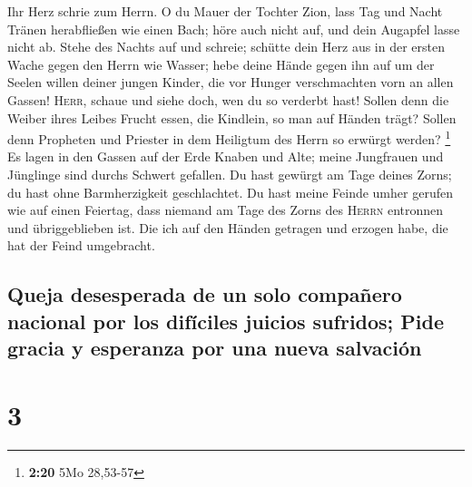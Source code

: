 Ihr Herz schrie zum Herrn. O du Mauer der Tochter Zion,
lass Tag und Nacht Tränen herabfließen wie einen Bach; höre auch nicht
auf, und dein Augapfel lasse nicht ab.  Stehe des Nachts
auf und schreie; schütte dein Herz aus in der ersten Wache gegen den
Herrn wie Wasser; hebe deine Hände gegen ihn auf um der Seelen willen
deiner jungen Kinder, die vor Hunger verschmachten vorn an allen Gassen!
 \textsc{Herr}, schaue und siehe doch, wen du so verderbt
hast! Sollen denn die Weiber ihres Leibes Frucht essen, die Kindlein, so
man auf Händen trägt? Sollen denn Propheten und Priester in dem
Heiligtum des Herrn so erwürgt werden? \footnote{\textbf{2:20} 5Mo
  28,53-57}  Es lagen in den Gassen auf der Erde Knaben
und Alte; meine Jungfrauen und Jünglinge sind durchs Schwert gefallen.
Du hast gewürgt am Tage deines Zorns; du hast ohne Barmherzigkeit
geschlachtet.  Du hast meine Feinde umher gerufen wie auf
einen Feiertag, dass niemand am Tage des Zorns des \textsc{Herrn}
entronnen und übriggeblieben ist. Die ich auf den Händen getragen und
erzogen habe, die hat der Feind umgebracht.

\hypertarget{queja-desesperada-de-un-solo-compauxf1ero-nacional-por-los-difuxedciles-juicios-sufridos-pide-gracia-y-esperanza-por-una-nueva-salvaciuxf3n}{%
\subsection{Queja desesperada de un solo compañero nacional por los
difíciles juicios sufridos; Pide gracia y esperanza por una nueva
salvación}\label{queja-desesperada-de-un-solo-compauxf1ero-nacional-por-los-difuxedciles-juicios-sufridos-pide-gracia-y-esperanza-por-una-nueva-salvaciuxf3n}}

\hypertarget{section-2}{%
\section{3}\label{section-2}}

